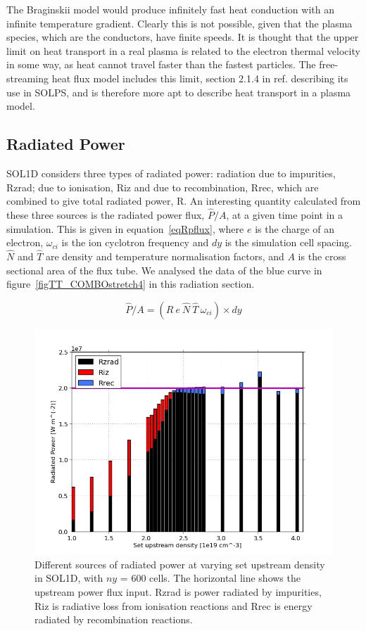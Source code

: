 \documentclass[12pt]{article}  %
\begin{document}
The Braginskii model would produce infinitely fast heat conduction with an infinite temperature gradient. Clearly this is not possible, given that the plasma species, which are the conductors, have finite speeds. It is thought that the upper limit on heat transport in a real plasma is related to the electron thermal velocity in some way, as heat cannot travel faster than the fastest particles. The free-streaming heat flux model includes this limit, section 2.1.4 in ref. \cite{Schneider2006} describing its use in SOLPS, and is therefore more apt to describe heat transport in a plasma model. 


\subsection{Radiated Power}\label{ssecRpower}
SOL1D considers three types of radiated power: radiation due to impurities, Rzrad; due to ionisation, Riz and due to recombination, Rrec, which are combined to give total radiated power, R. An interesting quantity calculated from these three sources is the radiated power flux, $ \hat{P}/A $, at a given time point in a simulation. This is given in equation~\ref{eqRpflux}, where $e$ is the charge of an electron, $\omega_{ci}$ is the ion cyclotron frequency and $dy$ is the simulation cell spacing. $\hat{N}$ and $\hat{T}$ are density and temperature normalisation factors, and $ A $ is the cross sectional area of the flux tube. We analysed the data of the blue curve in figure~\ref{figTT_COMBOstretch4} in this radiation section. 

\begin{equation}\label{eqRpflux}
\hat{P}/A = (R~e~\hat{N}~\hat{T}~\omega_{ci}) \times dy
\end{equation}

\begin{figure}
\includegraphics[scale=0.5]{Figures/sol1d/PRbar600ed.png}
\centering
\caption{Different sources of radiated power at varying set upstream density in SOL1D, with $ny$ = 600 cells. The horizontal line shows the upstream power flux input. Rzrad is power radiated by impurities, Riz is radiative loss from ionisation reactions and Rrec is energy radiated by recombination reactions.}\label{figPRbar600}
\end{figure}
\end{document}
